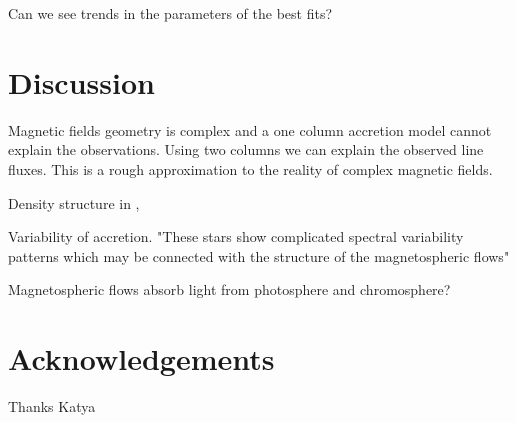 \documentclass[twocolumn,linenumbers]{aastex631}
\begin{document}
Can we see trends in the parameters of the best fits?

\section{Discussion} \label{Discussion}

Magnetic fields geometry is complex and a one column accretion model cannot explain the observations. Using two columns we can explain the observed line fluxes. This is a rough approximation to the reality of complex magnetic fields.

Density structure in \citet{zhaohuan2024}, \citet{espaillat2021}

Variability of accretion. "These stars show complicated spectral variability patterns which may be connected with the structure of the magnetospheric flows" \citep{romanova2003}

Magnetospheric flows absorb light from photosphere and chromosphere? \citep{atom2023}

\section*{Acknowledgements}

Thanks Katya


{}

\end{document}
